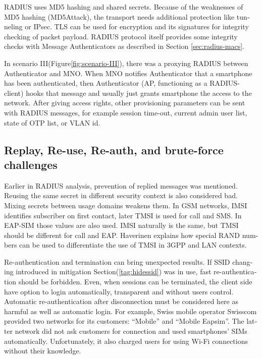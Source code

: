 \documentclass[12pt,a4paper,english]{tutthesis}
\begin{document}
\begin{otherlanguage}{english}
RADIUS uses MD5 hashing and shared secrets. Because of the weaknesses of
MD5 hashing (MD5Attack\cite{rfc5176}), the transport needs additional
protection like tunneling or IPsec. TLS can be used for encryption and
its signatures for integrity checking of packet payload.
RADIUS protocol itself provides some integrity checks with Message
Authenticators as described in Section \ref{sec:radius-macs}.



In scenario III(Figure\ref{fig:scenario-III}),  there was a proxying RADIUS between Authenticator
and MNO.  When MNO notifies Authenticator
that a smartphone has been authenticated, then Authenticator (AP, functioning
as a RADIUS-client) hooks that message and usually just grants
smartphone the access to the network. After giving access rights, other
provisioning parameters can be sent with RADIUS messages, for example
session time-out,
current admin user list, state of OTP list, or VLAN id.


\subsection{Replay, Re-use, Re-auth, and brute-force challenges}
\label{sec-6-4-5}
Earlier in RADIUS analysis, prevention of replied messages was
mentioned. Reusing the same secret in different security context is also
considered bad.  Mixing secrets between usage
domains weakens them.  In GSM networks, IMSI identifies subscriber on
first contact, later TMSI is used for call and SMS.  In EAP-SIM those
values are also used. IMSI naturally is the same, but TMSI should be
different for call and EAP.  Haverinen\cite{hav-doc} explains how
special RAND numbers can be used to differentiate the use of TMSI in 3GPP and LAN
contexts.

Re-authentication and termination can bring unexpected results.
If SSID changing introduced in mitigation Section(\ref{tag:hidessid}) was in use, fast re-authentication
should be forbidden\cite[p.11]{rfc5448}.
Even, when sessions can be terminated, the client side have 
option to login automatically, transparent and without users control.
Automatic re-authentication after disconnection  must be considered
here as harmful as well as automatic login. For example,
Swiss mobile operator Swisscom provided two networks for its customers:
``Mobile'' and ``Mobile Eapsim''. The latter network did not ask customers
for connection and used smartphones' SIMs automatically. Unfortunately,
it also charged users for using Wi-Fi connections without their 
knowledge.\cite{swisscom}






\end{otherlanguage}
\end{document}
